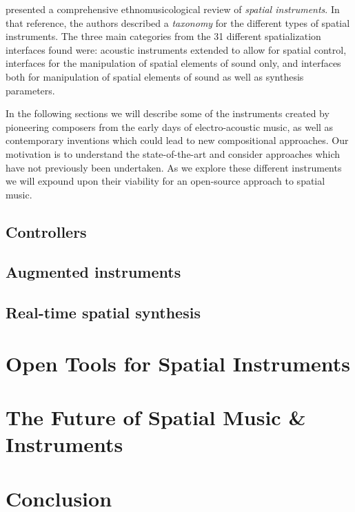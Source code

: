 \cite{pysiewicz2017instruments} presented a comprehensive ethnomusicological review of \textit{spatial instruments}. In that reference, the authors described a \textit{taxonomy} for the different types of spatial instruments. The three main categories from the 31 different spatialization interfaces found were: acoustic instruments extended to allow for spatial control, interfaces for the manipulation of spatial elements of sound only, and interfaces both for manipulation of spatial elements of sound as well as synthesis parameters. 

In the following sections we will describe some of the instruments created by pioneering composers from the early days of electro-acoustic music, as well as contemporary inventions which could lead to new compositional approaches. Our motivation is to understand the state-of-the-art and consider approaches which have not previously been undertaken. As we explore these different instruments we will expound upon their viability for an open-source approach to spatial music. 

\subsection{Controllers}
\subsection{Augmented instruments}
\subsection{Real-time spatial synthesis}

\section{Open Tools for Spatial Instruments}

\section{The Future of Spatial Music \& Instruments}

\section{Conclusion}



